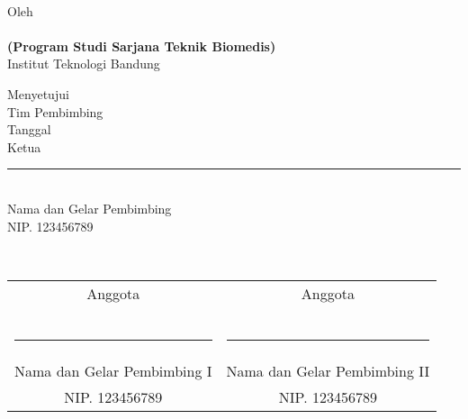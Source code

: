 \clearpage
\pagestyle{empty}

\begin{center}    
	\renewcommand{\baselinestretch}{1}
    \large{\bfseries \MakeUppercase{\thetitle}}
    \\[2\baselineskip]

    \normalsize{Oleh\\
    	\textbf{\theauthor}\\
    	\textbf{(Program Studi Sarjana Teknik Biomedis)}
    	\\[\baselineskip]
    	Institut Teknologi Bandung}
    \\[3\baselineskip]
    
    
    \normalsize{Menyetujui\\
    	Tim Pembimbing
    	\\[\baselineskip]
    	Tanggal \thedate\\[3\baselineskip]
    	Ketua\\[4\baselineskip]
    	\rule{5cm}{0.4pt} \\
    	Nama dan Gelar Pembimbing\\
    	NIP. 123456789}
    \\[2\baselineskip]
    
    \normalsize{%
    \setlength{\tabcolsep}{12pt}
    \begin{tabular}{c@{\hskip 0.5in}c}
        Anggota & Anggota \\
        & \\
        & \\
        & \\
        \rule{5cm}{0.4pt} & \rule{5cm}{0.4pt} \\
        Nama dan Gelar Pembimbing I & Nama dan Gelar Pembimbing II \\
        NIP. 123456789 & NIP. 123456789 \\
    \end{tabular}
    }

\end{center}
\clearpage
